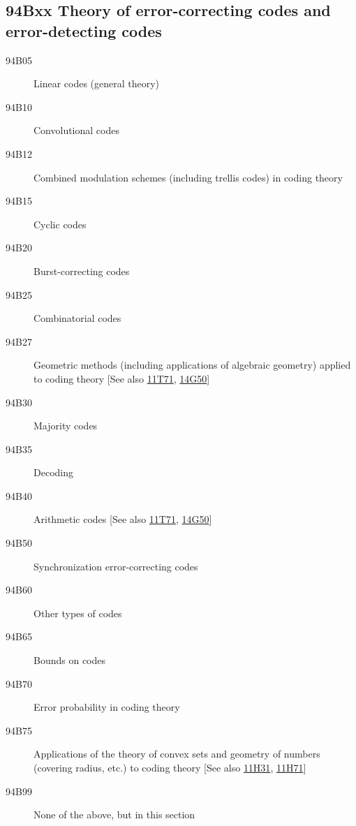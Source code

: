 \subsection*{94Bxx  Theory of error-correcting codes and error-detecting codes }\label{94Bxx}
\begin{description}  
\item [94B05]\label{94B05} Linear codes (general theory)
\item [94B10]\label{94B10} Convolutional codes
\item [94B12]\label{94B12} Combined modulation schemes (including trellis codes) in coding theory
\item [94B15]\label{94B15} Cyclic codes
\item [94B20]\label{94B20} Burst-correcting codes
\item [94B25]\label{94B25} Combinatorial codes
\item [94B27]\label{94B27} Geometric methods (including applications of algebraic geometry) applied to coding theory [See also \hyperref[11T71]{11T71}, \hyperref[14G50]{14G50}]
\item [94B30]\label{94B30} Majority codes
\item [94B35]\label{94B35} Decoding
\item [94B40]\label{94B40} Arithmetic codes [See also \hyperref[11T71]{11T71}, \hyperref[14G50]{14G50}]
\item [94B50]\label{94B50} Synchronization error-correcting codes
\item [94B60]\label{94B60} Other types of codes
\item [94B65]\label{94B65} Bounds on codes
\item [94B70]\label{94B70} Error probability in coding theory
\item [94B75]\label{94B75} Applications of the theory of convex sets and geometry of numbers (covering radius, etc.) to coding theory [See also \hyperref[11H31]{11H31}, \hyperref[11H71]{11H71}]
\item [94B99]\label{94B99} None of the above, but in this section
\end{description}
